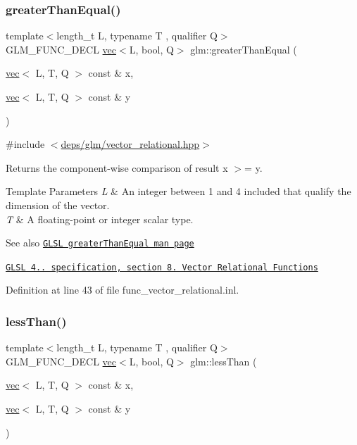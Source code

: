 \subsubsection{\texorpdfstring{greater\+Than\+Equal()}{greaterThanEqual()}}
{\footnotesize\ttfamily template$<$length\+\_\+t L, typename T , qualifier Q$>$ \\
G\+L\+M\+\_\+\+F\+U\+N\+C\+\_\+\+D\+E\+CL \hyperlink{structglm_1_1vec}{vec}$<$L, bool, Q$>$ glm\+::greater\+Than\+Equal (\begin{DoxyParamCaption}\item[{\hyperlink{structglm_1_1vec}{vec}$<$ L, T, Q $>$ const \&}]{x,  }\item[{\hyperlink{structglm_1_1vec}{vec}$<$ L, T, Q $>$ const \&}]{y }\end{DoxyParamCaption})}



{\ttfamily \#include $<$\hyperlink{vector__relational_8hpp}{deps/glm/vector\+\_\+relational.\+hpp}$>$}

Returns the component-\/wise comparison of result x $>$= y.


\begin{DoxyTemplParams}{Template Parameters}
{\em L} & An integer between 1 and 4 included that qualify the dimension of the vector. \\
\hline
{\em T} & A floating-\/point or integer scalar type.\\
\hline
\end{DoxyTemplParams}
\begin{DoxySeeAlso}{See also}
\href{http://www.opengl.org/sdk/docs/manglsl/xhtml/greaterThanEqual.xml}{\tt G\+L\+SL greater\+Than\+Equal man page} 

\href{http://www.opengl.org/registry/doc/GLSLangSpec.4.20.8.pdf}{\tt G\+L\+SL 4.. specification, section 8. Vector Relational Functions} 
\end{DoxySeeAlso}


Definition at line 43 of file func\+\_\+vector\+\_\+relational.\+inl.

\mbox{\label{group__core__func__vector__relational_ga314be073c42278ccb6fe7a7958213824}} 
\subsubsection{\texorpdfstring{less\+Than()}{lessThan()}}
{\footnotesize\ttfamily template$<$length\+\_\+t L, typename T , qualifier Q$>$ \\
G\+L\+M\+\_\+\+F\+U\+N\+C\+\_\+\+D\+E\+CL \hyperlink{structglm_1_1vec}{vec}$<$L, bool, Q$>$ glm\+::less\+Than (\begin{DoxyParamCaption}\item[{\hyperlink{structglm_1_1vec}{vec}$<$ L, T, Q $>$ const \&}]{x,  }\item[{\hyperlink{structglm_1_1vec}{vec}$<$ L, T, Q $>$ const \&}]{y }\end{DoxyParamCaption})}



